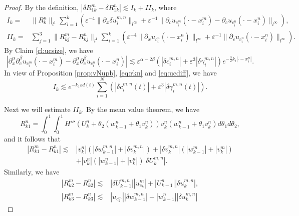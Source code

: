 \documentclass[11pt]{amsart}
\theoremstyle{remark}
\numberwithin{equation}{section}
\begin{document}
\begin{proof}
By the definition, $|\delta R_{1k}^m-\delta R_{1k}^n|\lesssim I_{k}+II_{k}$,
where
\begin{align*}
I_{k}= & \|R_{k}^n\|_{l^1}\sum_{i=1}^k({\varepsilon}^{-4} \|{\partial}_x{\delta u}_i^{m,n}\|_{l^\infty} 
+{\varepsilon}^{-1}\|{\partial}_cu_{c_i^m}(\cdot-x_i^m)-{\partial}_cu_{c_i^n}(\cdot-x_i^n)\|_{l^\infty}),\\
II_{k}=& \sum_{j=1}^3\|R_{kj}^m-R_{kj}^n\|_{l^1}\sum_{i=1}^k
\left({\varepsilon}^{-4}\|{\partial}_xu_{c_i^n}(\cdot-x_i^n)\|_{l^\infty}
+{\varepsilon}^{-1}\|{\partial}_cu_{c_i^n}(\cdot-x_i^n)\|_{l^\infty}\right).
\end{align*}
By Claim \ref{cl:ucsize}, we have
\begin{equation}
  \label{eq:ucdiff}
|{\partial}_x^\alpha{\partial}_c^\beta u_{c_i^m}(\cdot-x_i^m)
-{\partial}_x^\alpha{\partial}_c^\beta u_{c_i^n}(\cdot-x_i^n)|
\lesssim {\varepsilon}^{\alpha-2\beta}(|{\delta c}_i^{m,n}|+{\varepsilon}^3|{\delta\gamma}^{m,n}_i|)
e^{-\frac32k_i|\cdot-x_i^n|}.
\end{equation}
In view of Proposition \ref{prop:vNupb}, \eqref{eq:rkn} and
\eqref{eq:ucdiff}, we have
\begin{equation}
\label{eq:lemxc1}
I_k\lesssim e^{-k_1{\varepsilon} d(t)}
\sum_{i=1}^N\left(|{\delta c}^{m,n}_i(t)|+{\varepsilon}^3|{\delta\gamma}^{m,n}_i(t)|\right).
\end{equation}
\par
\par
Next we will estimate $II_{k}$.
By the mean value theorem, we have
$$R_{k1}^n=\int_0^1\int_0^1H'''(U_k^n+\theta_2(w_{k-1}^n+\theta_1v_k^n))
v_k^n(w_{k-1}^n+\theta_1v_k^n) d\theta_1d\theta_2,$$
and it follows that
\begin{equation}
  \label{eq:rk1dif}
  \begin{split}
|R_{k1}^m-R_{k1}^n| \lesssim
 & |v_k^n|(|{\delta w}^{m,n}_{k-1}|+|{\delta v}_k^{m,n}|) +|{\delta v}_k^{m,n}|(|w_{k-1}^m|+|v_k^m|)
\\ & +|v_k^n|(|w_{k-1}^n|+|v_k^n|)|{\delta U}_k^{m,n}|.    
  \end{split}
\end{equation}
Similarly, we have
\begin{align}
\label{eq:rk2dif}
|R_{k2}^m-R_{k2}^n|\lesssim &
|{\delta U}_{k-1}^{m,n}||u_{c_k}^m|+|U_{k-1}^n||{\delta u}_k^{m,n}|,
\\ \label{eq:rk3dif} 
|R_{k3}^m-R_{k3}^n|\lesssim & |u_{c_k^m}||{\delta w}^{m,n}_{k-1}|+|w_{k-1}^n ||{\delta u}_k^{m,n}|

\end{align}
\end{proof}
\end{document}
